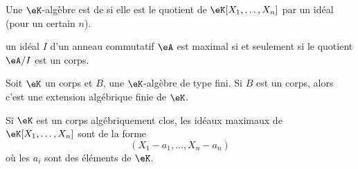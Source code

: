 \begin{definition}
    Une \( \eK\)-algèbre est de  si elle est le quotient de \( \eK[X_1,\ldots, X_n]\) par un idéal (pour un certain \( n\)).
\end{definition}

\begin{theorem}       \label{ThorqTTiJ}
    un idéal \( I\) d'un anneau commutatif \( \eA\) est maximal si et seulement si le quotient \( \eA/I\) est un corps.
\end{theorem}

\begin{theorem}      \label{ThonoZyKa}
    Soit \( \eK\) un corps et \( B\), une \( \eK\)-algèbre de type fini. Si \( B\) est un corps, alors c'est une extension algébrique finie de \( \eK\).
\end{theorem}

\begin{theorem}  \label{ThowgZYqx}
    Si \( \eK\) est un corps algébriquement clos, les idéaux maximaux de \( \eK[X_1,\ldots, X_n]\) sont de la forme
    \begin{equation}
        (X_1-a_1,\ldots, X_n-a_n)
    \end{equation}
    où les \( a_i\) sont des éléments de \( \eK\).
\end{theorem}

